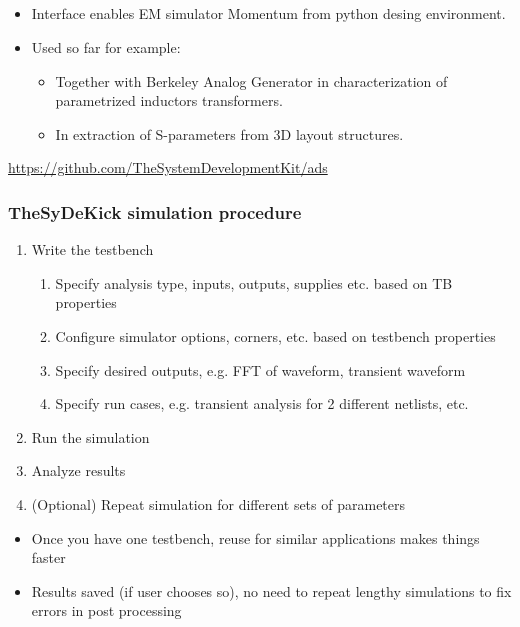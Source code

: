 \documentclass{sdkslides}
\newcommand{\sectname}{Section Name}
\begin{document}
\subsection*{\sectionname}
\begin{frame}[t]
    \frametitle{\sectionname}
    \begin{itemize}
        \item Interface enables EM simulator Momentum from python desing
            environment.
        \item Used so far for example:
            \begin{itemize}
                \item Together with Berkeley Analog Generator in
                    characterization of parametrized inductors transformers.
                \item In extraction of S-parameters from 3D layout structures.
            \end{itemize}
    \end{itemize}
    { \tiny \url{https://github.com/TheSystemDevelopmentKit/ads}}
\end{frame}
\renewcommand{\sectname}{TheSyDeKick simulation procedure}
\begin{frame}[t]
    \frametitle{\sectname}
        \begin{enumerate}
            \item Write the testbench
            \begin{enumerate}
                \item Specify analysis type, inputs, outputs, supplies etc. based on TB properties
                \item Configure simulator options, corners, etc. based on
                    testbench properties
                \item Specify desired outputs, e.g. FFT of waveform, transient waveform
                \item Specify run cases, e.g. transient analysis for 2 different netlists, etc.
            \end{enumerate}
            \item Run the simulation
            \item Analyze results
            \item (Optional) Repeat simulation for different sets of parameters
        \end{enumerate}
        \begin{itemize}
            \item Once you have one testbench, reuse for similar applications makes things faster
            \item Results saved (if user chooses so), no need to repeat lengthy simulations to fix errors in post processing
        \end{itemize}
\end{frame}
\end{document}
